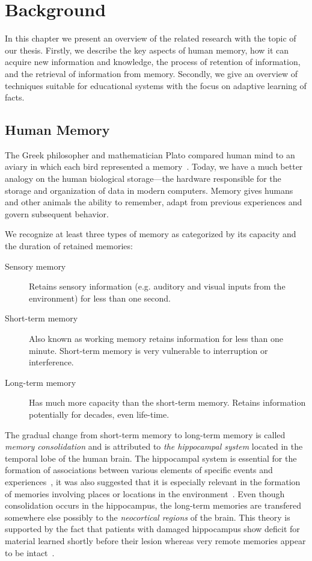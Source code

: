 \chapter{Background}

In this chapter we present an overview of the related research with the topic of our thesis. Firstly, we describe the key aspects of human memory, how it can acquire new information and knowledge, the process of retention of information, and the retrieval of information from memory. Secondly, we give an overview of techniques suitable for educational systems with the focus on adaptive learning of facts.

\section{Human Memory}

The Greek philosopher and mathematician Plato compared human mind to an aviary in which each bird represented a memory~\cite{MichaelW.Eysenck2008}. Today, we have a much better analogy on the human biological storage---the hardware responsible for the storage and organization of data in modern computers. Memory gives humans and other animals the ability to remember, adapt from previous experiences and govern subsequent behavior.

We recognize at least three types of memory as categorized by its capacity and the duration of retained memories:

\begin{description}
  \item [Sensory memory] Retains sensory information (e.g. auditory and visual inputs from the environment) for less than one second.
  \item [Short-term memory] Also known as working memory retains information for less than one minute. Short-term memory is very vulnerable to interruption or interference.
  \item [Long-term memory] Has much more capacity than the short-term memory. Retains information potentially for decades, even life-time.
\end{description}

The gradual change from short-term memory to long-term memory is called \textit{memory consolidation} and is attributed to \textit{the hippocampal system} located in the temporal lobe of the human brain. The hippocampal system is essential for the formation of associations between various elements of specific events and experiences~\cite{mcclelland1995there}, it was also suggested that it is especially relevant in the formation of memories involving places or locations in the environment~\cite{o1978hippocampus}. Even though consolidation occurs in the hippocampus, the long-term memories are transfered somewhere else possibly to the \textit{neocortical regions} of the brain. This theory is supported by the fact that patients with damaged hippocampus show deficit for material learned shortly before their lesion whereas very remote memories appear to be intact~\cite{mcclelland1995there}.

